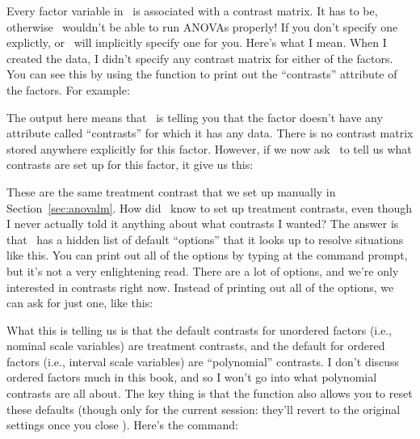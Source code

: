  

Every factor variable in \R\ is associated with a contrast matrix. It has to be, otherwise \R\ wouldn't be able to run ANOVAs properly! If you don't specify one explictly, or \R\ will implicitly specify one for you. Here's what I mean. When I created the  data, I didn't specify any contrast matrix for either of the factors. You can see this by using the  function to print out the ``contrasts'' attribute of the factors. For example:
The  output here means that \R\ is telling you that the  factor doesn't have any attribute called ``contrasts''  for which it has any data. There is no contrast matrix stored anywhere explicitly for this factor. However, if we now ask \R\ to tell us what contrasts are set up for this factor, it give us this:
These are the same treatment contrast that we set up manually in Section~\ref{sec:anovalm}. How did \R\ know to set up treatment contrasts, even though I never actually told it anything about what contrasts I wanted? The answer is that \R\ has a hidden list of default ``options'' that it looks up to resolve situations like this. You can print out all of the options by typing  at the command prompt, but it's not a very enlightening read. There are a lot of options, and we're only interested in contrasts right now. Instead of printing out all of the options, we can ask for just one, like this:
What this is telling us is that the default contrasts for unordered factors (i.e., nominal scale variables) are treatment contrasts, and the default for ordered factors (i.e., interval scale variables) are ``polynomial'' contrasts. I don't discuss ordered factors much in this book, and so I won't go into what polynomial contrasts are all about. The key thing is that the  function also allows you to reset these defaults (though only for the current session: they'll revert to the original settings once you close \R). Here's the command:
